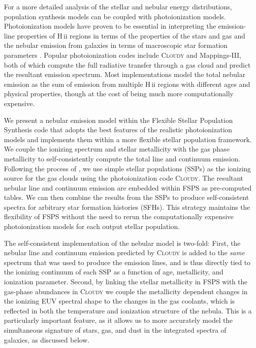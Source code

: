 \documentclass[trackchanges, twocolumn, tighten]{aastex61}
\newcommand{\FSPS}{{\sc FSPS}\xspace}
\newcommand{\Mappings}{{\sc Mappings-III}\xspace}
\newcommand{\Cloudy}{\textsc{Cloudy}\xspace}
\newcommand{\hii}{H\,{\sc ii}\xspace}
\begin{document}
For a more detailed analysis of the stellar and nebular energy distributions, population synthesis models can be coupled with photoionization models. Photoionization models have proven to be essential in interpreting the emission-line properties of \hii regions in terms of the properties of the stars and gas \citep[e.g.,][]{Dopita00} and the nebular emission from galaxies in terms of macroscopic star formation parameters \citep[e.g.,][]{Brinchmann04}. Popular photoionization codes include \Cloudy \citep{Ferland13} and \Mappings \citep{Groves04}, both of which compute the full radiative transfer through a gas cloud and predict the resultant emission spectrum. Most implementations model the total nebular emission as the sum of emission from multiple \hii regions with different ages and physical properties, though at the cost of being much more computationally expensive\citep[e.g.,][]{Kewley01, Moy01, CL01, Dopita06}.

We present a nebular emission model within the Flexible Stellar Population Synthesis code \citep[\FSPS\footnote{available on GitHub \url{https://github.com/cconroy20/fsps}},][]{Conroy09} that adopts the best features of the realistic photoionization models and implements them within a more flexible stellar population framework. We couple the ionizing spectrum and stellar metallicity with the gas phase metallicity to self-consistently compute the total line and continuum emission. Following the process of \citet{CL01}, we use simple stellar populations (SSPs) as the ionizing source for the gas clouds using the photoionization code \Cloudy. The resultant nebular line and continuum emission are embedded within \FSPS as pre-computed tables. We can then combine the results from the SSPs to produce self-consistent spectra for arbitrary star formation histories (SFHs). This strategy maintains the flexibility of \FSPS without the need to rerun the computationally expensive photoionization models for each output stellar population.

The self-consistent implementation of the nebular model is two-fold: First, the nebular line and continuum emission predicted by \Cloudy is added to the \emph{same} spectrum that was used to produce the emission lines, and is thus directly tied to the ionizing continuum of each SSP as a function of age, metallicity, and ionization parameter. Second, by linking the stellar metallicity in \FSPS with the gas-phase abundances in \Cloudy we couple the metallicity dependent changes in the ionizing EUV spectral shape to the changes in the gas coolants, which is reflected in both the temperature and ionization structure of the nebula. This is a particularly important feature, as it allows us to more accurately model the simultaneous signature of stars, gas, and dust in the integrated spectra of galaxies, as discussed below. 
\end{document}
